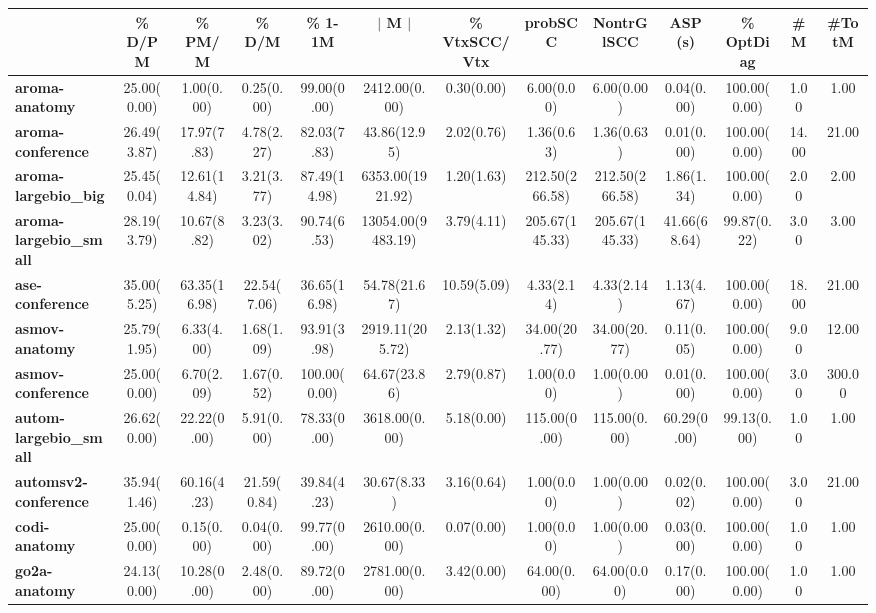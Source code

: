 \begin{tabular}{|l|c|c|c|c|c|c|c|c|c|c|c|c|}
\hline
&\textbf{\% D/PM}&\textbf{\% PM/M}&\textbf{\% D/M}&\textbf{\% 1-1M}&\textbf{$\vert$ M $\vert$}&\textbf{\% VtxSCC/Vtx}&\textbf{probSCC}&\textbf{NontrGlSCC}&\textbf{ASP (s)}&\textbf{\% OptDiag}&\textbf{\#M}&\textbf{\#TotM}\\\hline
\textbf{aroma-anatomy}&25.00(0.00)&1.00(0.00)&0.25(0.00)&99.00(0.00)&2412.00(0.00)&0.30(0.00)&6.00(0.00)&6.00(0.00)&0.04(0.00)&100.00(0.00)&1.00&1.00\\\hline
\textbf{aroma-conference}&26.49(3.87)&17.97(7.83)&4.78(2.27)&82.03(7.83)&43.86(12.95)&2.02(0.76)&1.36(0.63)&1.36(0.63)&0.01(0.00)&100.00(0.00)&14.00&21.00\\\hline
\textbf{aroma-largebio\_big}&25.45(0.04)&12.61(14.84)&3.21(3.77)&87.49(14.98)&6353.00(1921.92)&1.20(1.63)&212.50(266.58)&212.50(266.58)&1.86(1.34)&100.00(0.00)&2.00&2.00\\\hline
\textbf{aroma-largebio\_small}&28.19(3.79)&10.67(8.82)&3.23(3.02)&90.74(6.53)&13054.00(9483.19)&3.79(4.11)&205.67(145.33)&205.67(145.33)&41.66(68.64)&99.87(0.22)&3.00&3.00\\\hline
\textbf{ase-conference}&35.00(5.25)&63.35(16.98)&22.54(7.06)&36.65(16.98)&54.78(21.67)&10.59(5.09)&4.33(2.14)&4.33(2.14)&1.13(4.67)&100.00(0.00)&18.00&21.00\\\hline
\textbf{asmov-anatomy}&25.79(1.95)&6.33(4.00)&1.68(1.09)&93.91(3.98)&2919.11(205.72)&2.13(1.32)&34.00(20.77)&34.00(20.77)&0.11(0.05)&100.00(0.00)&9.00&12.00\\\hline
\textbf{asmov-conference}&25.00(0.00)&6.70(2.09)&1.67(0.52)&100.00(0.00)&64.67(23.86)&2.79(0.87)&1.00(0.00)&1.00(0.00)&0.01(0.00)&100.00(0.00)&3.00&300.00\\\hline
\textbf{autom-largebio\_small}&26.62(0.00)&22.22(0.00)&5.91(0.00)&78.33(0.00)&3618.00(0.00)&5.18(0.00)&115.00(0.00)&115.00(0.00)&60.29(0.00)&99.13(0.00)&1.00&1.00\\\hline
\textbf{automsv2-conference}&35.94(1.46)&60.16(4.23)&21.59(0.84)&39.84(4.23)&30.67(8.33)&3.16(0.64)&1.00(0.00)&1.00(0.00)&0.02(0.02)&100.00(0.00)&3.00&21.00\\\hline
\textbf{codi-anatomy}&25.00(0.00)&0.15(0.00)&0.04(0.00)&99.77(0.00)&2610.00(0.00)&0.07(0.00)&1.00(0.00)&1.00(0.00)&0.03(0.00)&100.00(0.00)&1.00&1.00\\\hline
\textbf{go2a-anatomy}&24.13(0.00)&10.28(0.00)&2.48(0.00)&89.72(0.00)&2781.00(0.00)&3.42(0.00)&64.00(0.00)&64.00(0.00)&0.17(0.00)&100.00(0.00)&1.00&1.00\\\hline

\end{tabular}
